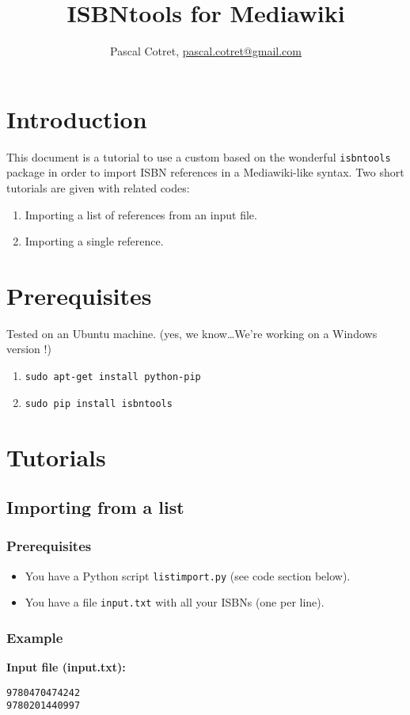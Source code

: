 \documentclass[a4paper,11pt]{article}
\author{Pascal Cotret, \href{mailto:pascal.cotret@gmail.com}{pascal.cotret@gmail.com}}
\title{ISBNtools for Mediawiki}
\date{}
\begin{document}
\maketitle
\vspace{-.5cm}
\section*{Introduction}
This document is a tutorial to use a custom based on the wonderful \texttt{isbntools} package in order to import ISBN references in a Mediawiki-like syntax. Two short tutorials are given with related codes:
\begin{enumerate}
\item Importing a list of references from an input file.
\item Importing a single reference.
\end{enumerate}
\section{Prerequisites}
Tested on an Ubuntu machine. (yes, we know\ldots We're working on a Windows version !)
\begin{enumerate}
\item \texttt{sudo apt-get install python-pip}
\item \texttt{sudo pip install isbntools}
\end{enumerate}\newpage
\section{Tutorials}
\subsection{Importing from a list}
\subsubsection{Prerequisites}
\begin{itemize}
\item You have a Python script \texttt{listimport.py} (see code section below). 
\item You have a file \texttt{input.txt} with all your ISBNs (one per line). 
\end{itemize}
\subsubsection{Example}
\textbf{Input file (input.txt):}
\begin{lstlisting}
9780470474242
9780201440997
\end{lstlisting}
\end{document}
